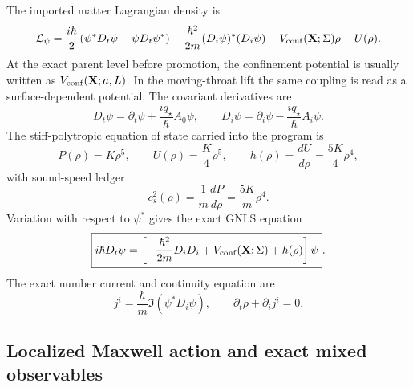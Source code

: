 The imported matter Lagrangian density is
\begin{equation}
\label{eq:part01-Lpsi}
\mathcal L_\psi
=
\frac{i\hbar}{2}\left(\psi^\ast D_t\psi-\psi D_t\psi^\ast\right)
-\frac{\hbar^2}{2m}(D_i\psi)^\ast(D_i\psi)
-V_{\rm conf}(\mathbf X;\Sigma)\rho
-U(\rho).
\end{equation}
At the exact parent level before promotion, the confinement potential is usually written as \(V_{\rm conf}(\mathbf X;a,L)\).  In the moving-throat lift the same coupling is read as a surface-dependent potential.  The covariant derivatives are
\begin{equation}
\label{eq:part01-covariant-derivatives}
D_t\psi=\partial_t\psi+\frac{iq_\star}{\hbar}A_0\psi,
\qquad
D_i\psi=\partial_i\psi-\frac{iq_\star}{\hbar}A_i\psi.
\end{equation}
The stiff-polytropic equation of state carried into the program is
\begin{equation}
\label{eq:part01-eos}
P(\rho)=K\rho^5,
\qquad
U(\rho)=\frac K4\rho^5,
\qquad
h(\rho)=\frac{dU}{d\rho}=\frac{5K}{4}\rho^4,
\end{equation}
with sound-speed ledger
\begin{equation}
\label{eq:part01-sound-speed}
c_s^2(\rho)=\frac1m\frac{dP}{d\rho}=\frac{5K}{m}\rho^4.
\end{equation}
Variation with respect to \(\psi^\ast\) gives the exact GNLS equation
\begin{equation}
\label{eq:part01-gnls}
\boxed{
i\hbar D_t\psi
=
\left[-\frac{\hbar^2}{2m}D_iD_i+V_{\rm conf}(\mathbf X;\Sigma)+h(\rho)\right]\psi}.
\end{equation}
The exact number current and continuity equation are
\begin{equation}
\label{eq:part01-number-current}
\boxed{
j^i=\frac{\hbar}{m}\Im(\psi^\ast D_i\psi),
\qquad
\partial_t\rho+\partial_i j^i=0}.
\end{equation}

\subsection{Localized Maxwell action and exact mixed observables}
\label{subsec:part01-maxwell-action}

